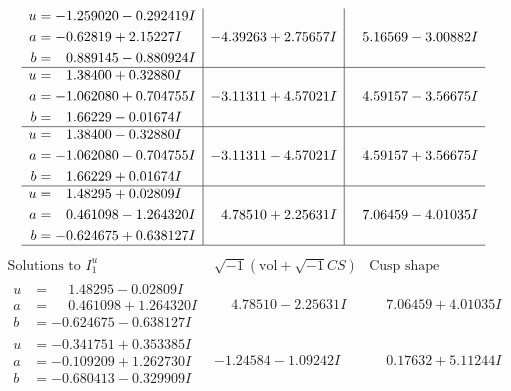 \documentclass[1p]{elsarticle_modified}
\theoremstyle{definition}
\newcommand{\I}{\sqrt{-1}}
\begin{document}
$$\begin{array}{c|c|c}
\begin{aligned}
u &= -1.259020 - 0.292419 I \\
a &= -0.62819 + 2.15227 I \\
b &= \phantom{-}0.889145 - 0.880924 I\end{aligned}
 & -4.39263 + 2.75657 I & \phantom{-}5.16569 - 3.00882 I \\ \hline\begin{aligned}
u &= \phantom{-}1.38400 + 0.32880 I \\
a &= -1.062080 + 0.704755 I \\
b &= \phantom{-}1.66229 - 0.01674 I\end{aligned}
 & -3.11311 + 4.57021 I & \phantom{-}4.59157 - 3.56675 I \\ \hline\begin{aligned}
u &= \phantom{-}1.38400 - 0.32880 I \\
a &= -1.062080 - 0.704755 I \\
b &= \phantom{-}1.66229 + 0.01674 I\end{aligned}
 & -3.11311 - 4.57021 I & \phantom{-}4.59157 + 3.56675 I \\ \hline\begin{aligned}
u &= \phantom{-}1.48295 + 0.02809 I \\
a &= \phantom{-}0.461098 - 1.264320 I \\
b &= -0.624675 + 0.638127 I\end{aligned}
 & \phantom{-}4.78510 + 2.25631 I & \phantom{-}7.06459 - 4.01035 I\\
 \hline 
 \end{array}$$\newpage$$\begin{array}{c|c|c}  
\text{Solutions to }I^u_{1}& \I (\text{vol} + \sqrt{-1}CS) & \text{Cusp shape}\\
 \hline 
\begin{aligned}
u &= \phantom{-}1.48295 - 0.02809 I \\
a &= \phantom{-}0.461098 + 1.264320 I \\
b &= -0.624675 - 0.638127 I\end{aligned}
 & \phantom{-}4.78510 - 2.25631 I & \phantom{-}7.06459 + 4.01035 I \\ \hline\begin{aligned}
u &= -0.341751 + 0.353385 I \\
a &= -0.109209 + 1.262730 I \\
b &= -0.680413 - 0.329909 I\end{aligned}
 & -1.24584 - 1.09242 I & \phantom{-}0.17632 + 5.11244 I \\ \hline\begin{aligned}

\end{aligned}
\end{array}$$
\end{document}
